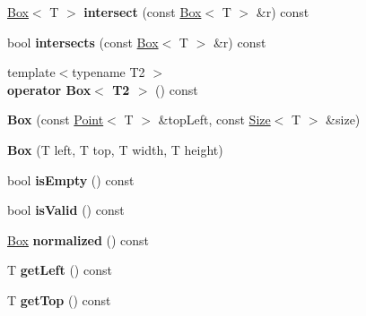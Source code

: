 \begin{DoxyCompactItemize}
\item 
\hypertarget{class_box_a88cd9779de891c4c86f5a6ebc53f6e16}{
\hyperlink{class_box}{Box}$<$ T $>$ {\bfseries intersect} (const \hyperlink{class_box}{Box}$<$ T $>$ \&r) const }
\label{class_box_a88cd9779de891c4c86f5a6ebc53f6e16}

\item 
\hypertarget{class_box_aac069f504fa8b0efde1817ec25bf72ca}{
bool {\bfseries intersects} (const \hyperlink{class_box}{Box}$<$ T $>$ \&r) const }
\label{class_box_aac069f504fa8b0efde1817ec25bf72ca}

\item 
\hypertarget{class_box_a59ff93ffee6386885d5eb5cb13610b95}{
{\footnotesize template$<$typename T2 $>$ }\\{\bfseries operator Box$<$ T2 $>$} () const }
\label{class_box_a59ff93ffee6386885d5eb5cb13610b95}

\item 
\hypertarget{class_box_ad8f5cd82926a0d9249167b4c1e4be4cc}{
{\bfseries Box} (const \hyperlink{class_point}{Point}$<$ T $>$ \&topLeft, const \hyperlink{class_size}{Size}$<$ T $>$ \&size)}
\label{class_box_ad8f5cd82926a0d9249167b4c1e4be4cc}

\item 
\hypertarget{class_box_adacfc3678389e68945da2976da8693ec}{
{\bfseries Box} (T left, T top, T width, T height)}
\label{class_box_adacfc3678389e68945da2976da8693ec}

\item 
\hypertarget{class_box_ae312de0c0f0bc30588cf928c8ea648d1}{
bool {\bfseries isEmpty} () const }
\label{class_box_ae312de0c0f0bc30588cf928c8ea648d1}

\item 
\hypertarget{class_box_abe6f8df2b637e9b16d4ee3e7a7d17d2b}{
bool {\bfseries isValid} () const }
\label{class_box_abe6f8df2b637e9b16d4ee3e7a7d17d2b}

\item 
\hypertarget{class_box_a817dc7dc90d3b2b8233630a3a8ffbd4d}{
\hyperlink{class_box}{Box} {\bfseries normalized} () const }
\label{class_box_a817dc7dc90d3b2b8233630a3a8ffbd4d}

\item 
\hypertarget{class_box_aed2302c4897867af461de311c6e42c25}{
T {\bfseries getLeft} () const }
\label{class_box_aed2302c4897867af461de311c6e42c25}

\item 
\hypertarget{class_box_a4f48783c0481ebf5790c2b72d6e1a450}{
T {\bfseries getTop} () const }
\label{class_box_a4f48783c0481ebf5790c2b72d6e1a450}


\end{DoxyCompactItemize}
